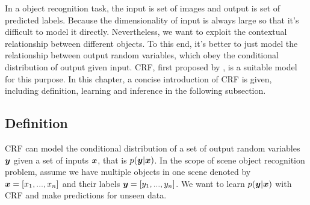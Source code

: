 In a object recognition task, the input is set of images and output is set of predicted labels. Because the dimensionality of input is always large so that it's difficult to model it directly. Nevertheless, we want to exploit the contextual relationship between different objects. To this end, it's better to just model the relationship between output random variables, which obey the conditional distribution of output given input. \gls{CRF}, first proposed by \cite{lafferty2001conditional}, is a suitable model for this purpose. In this chapter, a concise introduction of \gls{CRF} is given, including definition, learning and inference in the following subsection.

\subsection{Definition} \label{crf_def}
\gls{CRF} can model the conditional distribution of a set of output random variables $\boldsymbol y$ given a set of inputs $\boldsymbol x$, that is $p(\boldsymbol y | \boldsymbol x)$. In the scope of scene object recognition problem, assume we have multiple objects in one scene denoted by $\boldsymbol x = [x_1, ..., x_n]$ and their labels $\boldsymbol y = [y_1, ..., y_n]$. We want to learn $p(\boldsymbol y | \boldsymbol x)$ with \gls{CRF} and make predictions for unseen data.  

